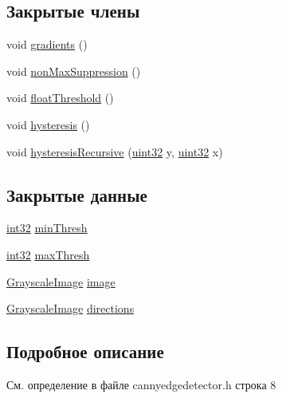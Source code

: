 \subsection*{Закрытые члены}
\begin{DoxyCompactItemize}
\item 
void \hyperlink{class_canny_edge_detector_ad5843016a5e861eed74fa24f4abd688b}{gradients} ()
\item 
void \hyperlink{class_canny_edge_detector_a8622531b7410c002284f466df043af13}{non\+Max\+Suppression} ()
\item 
void \hyperlink{class_canny_edge_detector_a0c6b710be023dec7cfd38e55d42066a3}{float\+Threshold} ()
\item 
void \hyperlink{class_canny_edge_detector_ab4bf8eb092943ab7042762ee48aeb0c1}{hysteresis} ()
\item 
void \hyperlink{class_canny_edge_detector_a3f180b6eb26a8afa34a03c8cdd0781ca}{hysteresis\+Recursive} (\hyperlink{number_8h_a1134b580f8da4de94ca6b1de4d37975e}{uint32} y, \hyperlink{number_8h_a1134b580f8da4de94ca6b1de4d37975e}{uint32} x)
\end{DoxyCompactItemize}
\subsection*{Закрытые данные}
\begin{DoxyCompactItemize}
\item 
\hyperlink{number_8h_a43d43196463bde49cb067f5c20ab8481}{int32} \hyperlink{class_canny_edge_detector_ae88472e936f883044b00e8cd50f662c6}{min\+Thresh}
\item 
\hyperlink{number_8h_a43d43196463bde49cb067f5c20ab8481}{int32} \hyperlink{class_canny_edge_detector_ab551b06077d0221f1caa6e5e4cce48d9}{max\+Thresh}
\item 
\hyperlink{class_grayscale_image}{Grayscale\+Image} \hyperlink{class_canny_edge_detector_a271e3c9036a5cb2611bb1b7da4d7d146}{image}
\item 
\hyperlink{class_grayscale_image}{Grayscale\+Image} \hyperlink{class_canny_edge_detector_a96275be60c2ffdc3798384f7a3588684}{directions}
\end{DoxyCompactItemize}


\subsection{Подробное описание}


См. определение в файле cannyedgedetector.\+h строка 8



